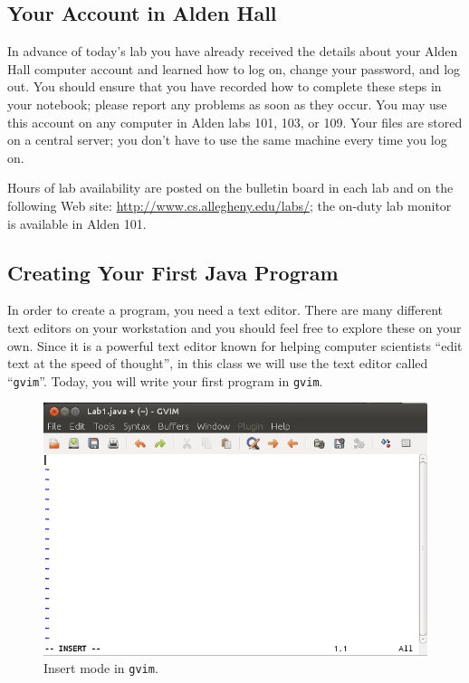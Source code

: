 \vspace*{-.3in}
\subsection*{Your Account in Alden Hall}

In advance of today's lab you have already received the details about your Alden Hall computer account and learned how to
log on, change your password, and log out.  You should ensure that you have recorded how to complete these steps in your
notebook; please report any problems as soon as they occur. You may use this account on any computer in Alden labs 101,
103, or 109. Your files are stored on a central server; you don't have to use the same machine every time you log on.

Hours of lab availability are posted on the bulletin board in each lab and on the following Web site:
\url{http://www.cs.allegheny.edu/labs/}; the on-duty lab monitor is available in Alden 101.

\vspace*{-.1in}
\subsection*{Creating Your First Java Program}

In order to create a program, you need a text editor. There are many different text editors on your workstation and
you should feel free to explore these on your own. Since it is a powerful text editor known for helping computer
scientists ``edit text at the speed of thought'', in this class we will use the text editor called ``{\tt gvim}''.
Today, you will write your first program in {\tt gvim}.


\begin{figure}[htbp]
  \centering
  \includegraphics[width=4.5in]{images/gvim-insert}
  \caption{Insert mode in {\tt gvim}.}
  \label{gvim-insert}
\end{figure}

